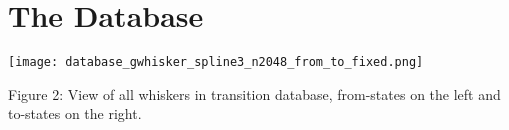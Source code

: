 \section*{The Database}

\centering\texttt{[image: database\_gwhisker\_spline3\_n2048\_from\_to\_fixed.png]}
\begin{center}
\label{fig:database}
Figure 2: View of all whiskers in transition database, from-states on the left and to-states on the right.
\end{center}
